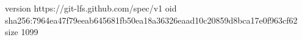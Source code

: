 version https://git-lfs.github.com/spec/v1
oid sha256:7964ea47f79eeab645681fb50ea18a36326eaad10c20859d8bca17e0f963cf62
size 1099

